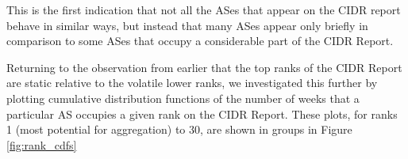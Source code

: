 %

This is the first indication that not all the ASes that appear on the CIDR
report behave in similar ways, but instead that many ASes appear only briefly
in comparison to some ASes that occupy a considerable part of the CIDR Report.


Returning to the observation from earlier that the top ranks of the CIDR Report
are static relative to the volatile lower ranks, we investigated this further
by plotting cumulative distribution functions of the number of weeks that a
particular AS occupies a given rank on the CIDR Report. These plots, for ranks
1 (most potential for aggregation) to 30, are shown in groups in Figure
\ref{fig:rank_cdfs}

